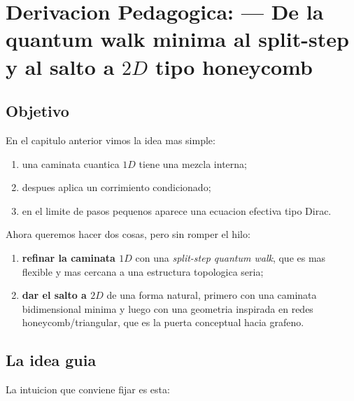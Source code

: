 \chapter{Derivacion Pedagogica: --- De la quantum walk minima al split-step y al salto a \(2D\) tipo honeycomb}
\label{ch:splitstep-qw-2d-honeycomb}







\section{Objetivo}

En el capitulo anterior vimos la idea mas simple:

\begin{enumerate}[leftmargin=*]
  \item una caminata cuantica \(1D\) tiene una mezcla interna;
  \item despues aplica un corrimiento condicionado;
  \item en el limite de pasos pequenos aparece una ecuacion efectiva tipo Dirac.
\end{enumerate}

Ahora queremos hacer dos cosas, pero sin romper el hilo:

\begin{enumerate}[leftmargin=*]
  \item \textbf{refinar la caminata \(1D\)} con una \emph{split-step quantum walk}, que es mas flexible y mas cercana a una estructura topologica seria;
  \item \textbf{dar el salto a \(2D\)} de una forma natural, primero con una caminata bidimensional minima y luego con una geometria inspirada en redes honeycomb/triangular, que es la puerta conceptual hacia grafeno.
\end{enumerate}

\section{La idea guia}

La intuicion que conviene fijar es esta:

